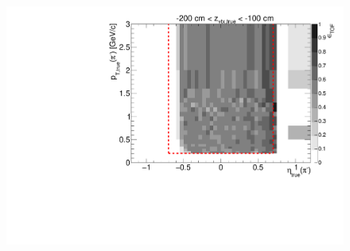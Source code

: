 \begin{figure}[hb]
{  \includegraphics[width=\linewidth,page=10]{graphics/eff/Eff2D_TOF_pion_Minus.pdf}
}%
\end{figure}
